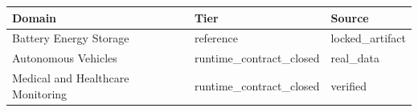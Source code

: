 \begin{tabular}{lll}
\toprule
Domain & Tier & Source\\
\midrule
Battery Energy Storage & reference & locked_artifact\\
Autonomous Vehicles & runtime_contract_closed & real_data\\
Medical and Healthcare Monitoring & runtime_contract_closed & verified\\
\bottomrule
\end{tabular}
